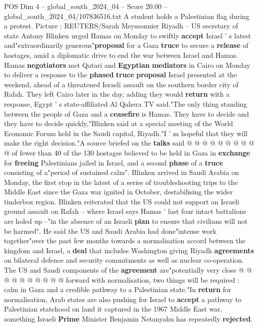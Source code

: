 \begin{textsample}{POS Dim 4 – global\_south\_2024\_04 – Score 20.00 – global\_south\_2024\_04/107836516.txt}  \label{ex:f4_pos_266}
A student holds a Palestinian flag during a protest.
Picture : REUTERS/Sarah Meyssonnier Riyadh -- US secretary of state Antony Blinken urged Hamas on Monday to swiftly \textbf{accept} Israel ' s latest and"extraordinarily generous"\textbf{proposal} for a Gaza \textbf{truce} to secure a \textbf{release} of hostages, amid a diplomatic drive to end the war between Israel and Hamas.
Hamas \textbf{negotiators} met Qatari and \textbf{Egyptian} \textbf{mediators} in Cairo on Monday to deliver a response to the \textbf{phased} \textbf{truce} \textbf{proposal} Israel presented at the weekend, ahead of a threatened Israeli assault on the southern border city of Rafah.
They left Cairo later in the day, adding they would \textbf{return} with a response, Egypt ' s state-affiliated Al Qahera TV said."The only thing standing between the people of Gaza and a \textbf{ceasefire} is Hamas.
They have to decide and they have to decide quickly,"Blinken said at a special meeting of the World Economic Forum held in the Saudi capital, Riyadh."I ' m hopeful that they will make the right decision."A source briefed on the \textbf{talks} said @ @ @ @ @ @ @ @ @ @ of fewer than 40 of the 130 hostages believed to be held in Gaza in \textbf{exchange} for \textbf{freeing} Palestinians jailed in Israel, and a second \textbf{phase} of a \textbf{truce} consisting of a"period of sustained calm".
Blinken arrived in Saudi Arabia on Monday, the first stop in the latest of a series of troubleshooting trips to the Middle East since the Gaza war ignited in October, destabilising the wider tinderbox region.
Blinken reiterated that the US could not support an Israeli ground assault on Rafah -- where Israel says Hamas ' last four intact battalions are holed up --"in the absence of an Israeli \textbf{plan} to ensure that civilians will not be harmed".
He said the US and Saudi Arabia had done"intense work together"over the past few months towards a normalisation accord between the kingdom and Israel, a \textbf{deal} that includes Washington giving Riyadh \textbf{agreements} on bilateral defence and security commitments as well as nuclear co-operation.
The US and Saudi components of the \textbf{agreement} are"potentially very close @ @ @ @ @ @ @ @ @ @ forward with normalisation, two things will be required : calm in Gaza and a credible pathway to a Palestinian state."In \textbf{return} for normalisation, Arab states are also pushing for Israel to \textbf{accept} a pathway to Palestinian statehood on land it captured in the 1967 Middle East war, something Israeli \textbf{Prime} Minister Benjamin Netanyahu has repeatedly \textbf{rejected}.

\end{textsample}
